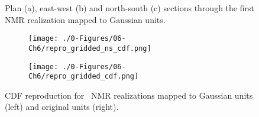 
\begin{figure}
    \centering
    \tabskip=0pt
    \caption{Plan (a), east-west (b) and north-south (c) sections through the first \gls{NMR} realization mapped to Gaussian units.}
    \label{fig:ns_reals}
\end{figure}

\begin{figure}
    \begin{subfigure}{0.45\textwidth}
        \centering
        \texttt{[image: ./0-Figures/06-Ch6/repro\_gridded\_ns\_cdf.png]}
    \end{subfigure}
    \begin{subfigure}{0.45\textwidth}
        \centering
        \texttt{[image: ./0-Figures/06-Ch6/repro\_gridded\_cdf.png]}
    \end{subfigure}
    \caption{\gls{CDF} reproduction for \csnreals \ \gls{NMR} realizations mapped to Gaussian units (left) and original units (right).}
    \label{fig:repro_gridded_cdfs}
\end{figure}

